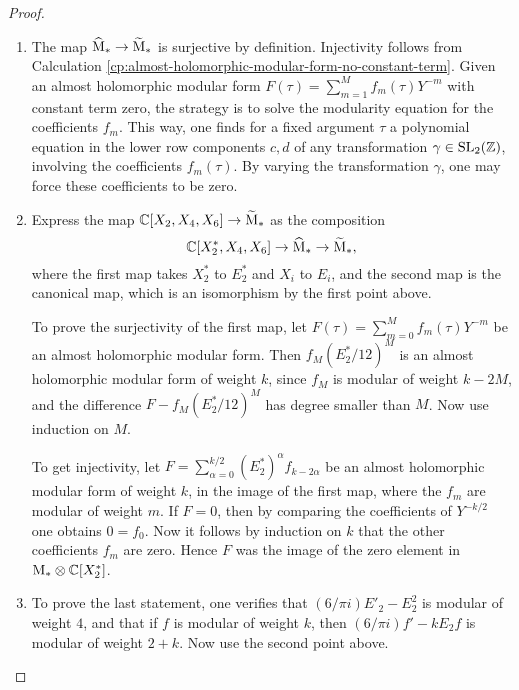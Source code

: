 \begin{proof}
 \begin{enumerate}
  \item The map $\widehat{\mathrm{M}}_* \to \widetilde{\mathrm{M}}_*$ is surjective by definition. Injectivity follows from Calculation \ref{cp:almost-holomorphic-modular-form-no-constant-term}. Given an almost holomorphic modular form $F(\tau)=\sum_{m=1}^Mf_m(\tau)Y^{-m}$ with constant term zero, the strategy is to solve the modularity equation for the coefficients $f_m$. This way, one finds for a fixed argument $\tau$ a polynomial equation in the lower row components  $c,d$ of any transformation $\gamma \in \operatorname{SL}_2(\mathbb{Z})$, involving the coefficients $f_m(\tau)$. By varying the transformation $\gamma$, one may force these coefficients to be zero.
  \item Express the map $\mathbb{C}[X_2, X_4, X_6]\to \widetilde{\mathrm{M}}_*$ as the composition \[\mathbb{C}[X^*_2, X_4, X_6]\to \widehat{\mathrm{M}}_* \to \widetilde{\mathrm{M}}_*,\] where the first map takes $X^*_2$ to $E_2^*$ and $X_i$ to $E_i$, and the second map is the canonical map, which is an isomorphism by the first point above.
  
  To prove the surjectivity of the first map, let $F(\tau)=\sum_{m=0}^Mf_m(\tau)Y^{-m}$ be an almost holomorphic modular form. Then $f_M (E_2^*/12)^M$ is an almost holomorphic modular form of weight $k$, since $f_M$ is modular of weight $k-2M$, and the difference $F - f_M (E_2^*/12)^M$ has degree smaller than $M$. Now use induction on $M$.
  
  To get injectivity, let $F=\sum_{\alpha=0}^{k/2}(E_2^*)^\alpha f_{k-2\alpha}$ be an almost holomorphic modular form of weight $k$, in the image of the first map, where the $f_m$ are modular of weight $m$. If $F=0$, then by comparing the coefficients of $Y^{-k/2}$ one obtains $0=f_0$. Now it follows by induction on $k$ that the other coefficients $f_m$ are zero. Hence $F$ was the image of the zero element in $\mathrm{M}_* \otimes \mathbb{C}[X^*_2]$.
  \item To prove the last statement, one verifies that $(6/\pi i) E'_2-E_2^2$ is modular of weight $4$, and that if $f$ is modular of weight $k$, then $(6/\pi i)f' - kE_2f$ is modular of weight $2+k$. Now use the second point above.
 \end{enumerate}

\end{proof}


